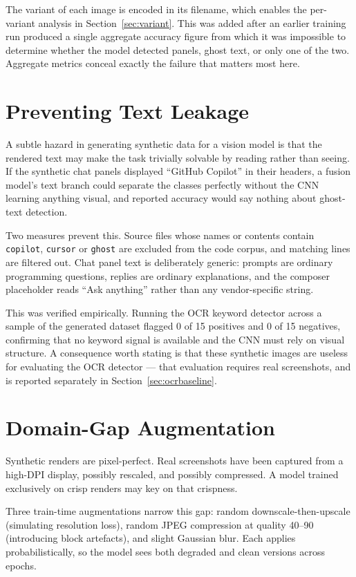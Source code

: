 \documentclass[12pt,oneside]{report}
\newcommand{\code}[1]{\texttt{\small #1}}
\begin{document}
The variant of each image is encoded in its filename, which enables the
per-variant analysis in Section~\ref{sec:variant}. This was added after an
earlier training run produced a single aggregate accuracy figure from which it
was impossible to determine whether the model detected panels, ghost text, or
only one of the two. Aggregate metrics conceal exactly the failure that matters
most here.

\section{Preventing Text Leakage}
\label{sec:leakage}

A subtle hazard in generating synthetic data for a vision model is that the
rendered text may make the task trivially solvable by reading rather than
seeing. If the synthetic chat panels displayed ``GitHub Copilot'' in their
headers, a fusion model's text branch could separate the classes perfectly
without the CNN learning anything visual, and reported accuracy would say
nothing about ghost-text detection.

Two measures prevent this. Source files whose names or contents contain
\code{copilot}, \code{cursor} or \code{ghost} are excluded from the code corpus,
and matching lines are filtered out. Chat panel text is deliberately generic:
prompts are ordinary programming questions, replies are ordinary explanations,
and the composer placeholder reads ``Ask anything'' rather than any
vendor-specific string.

This was verified empirically. Running the OCR keyword detector across a sample
of the generated dataset flagged 0 of 15 positives and 0 of 15 negatives,
confirming that no keyword signal is available and the CNN must rely on visual
structure. A consequence worth stating is that these synthetic images are
useless for evaluating the OCR detector --- that evaluation requires real
screenshots, and is reported separately in Section~\ref{sec:ocrbaseline}.

\section{Domain-Gap Augmentation}
\label{sec:augment}

Synthetic renders are pixel-perfect. Real screenshots have been captured from a
high-DPI display, possibly rescaled, and possibly compressed. A model trained
exclusively on crisp renders may key on that crispness.

Three train-time augmentations narrow this gap: random downscale-then-upscale
(simulating resolution loss), random JPEG compression at quality 40--90
(introducing block artefacts), and slight Gaussian blur. Each applies
probabilistically, so the model sees both degraded and clean versions across
epochs.
\end{document}
